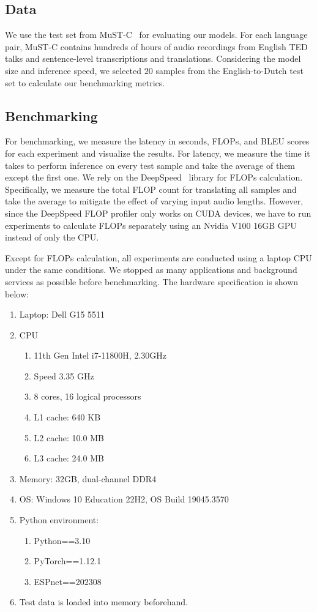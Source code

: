 \documentclass[11pt]{article}
\begin{document}
\subsection{Data}

We use the test set from MuST-C~\cite{mustc} for evaluating our models.
For each language pair, MuST-C contains hundreds of hours of audio recordings from English TED talks and sentence-level transcriptions and translations.
Considering the model size and inference speed, we selected $20$ samples from the English-to-Dutch test set to calculate our benchmarking metrics.


\subsection{Benchmarking}

For benchmarking, we measure the latency in seconds, FLOPs, and BLEU scores for each experiment and visualize the results.
For latency, we measure the time it takes to perform inference on every test sample and take the average of them except the first one.
We rely on the DeepSpeed~\cite{deepspeed} library for FLOPs calculation.
Specifically, we measure the total FLOP count for translating all samples and take the average to mitigate the effect of varying input audio lengths.
However, since the DeepSpeed FLOP profiler only works on CUDA devices, we have to run experiments to calculate FLOPs separately using an Nvidia V100 16GB GPU instead of only the CPU.

Except for FLOPs calculation, all experiments are conducted using a laptop CPU under the same conditions.
We stopped as many applications and background services as possible before benchmarking.
The hardware specification is shown below:
\begin{enumerate}
    \item Laptop: Dell G15 5511
    \item CPU
    \begin{enumerate}
        \item 11th Gen Intel i7-11800H, 2.30GHz
        \item Speed 3.35 GHz
        \item 8 cores, 16 logical processors
        \item L1 cache: 640 KB
        \item L2 cache: 10.0 MB
        \item L3 cache: 24.0 MB
    \end{enumerate}
    \item Memory: 32GB, dual-channel DDR4
    \item OS: Windows 10 Education 22H2, OS Build 19045.3570
    \item Python environment:
    \begin{enumerate}
        \item Python==3.10
        \item PyTorch==1.12.1
        \item ESPnet==202308
    \end{enumerate}
    \item Test data is loaded into memory beforehand.

\end{enumerate}
\end{document}
